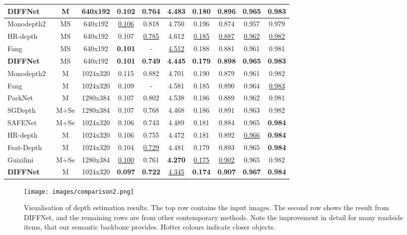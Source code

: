 \documentclass{bmvc2k}
\begin{document}
\begin{table*}[t]
{\begin{tabular}{|l |c|c||c c c c| c c c|}
\bf{DIFFNet} & M & 640x192 & \bf{0.102}  &   \bf{0.764}  &   \bf{4.483}  &   \bf{0.180}  &   \bf{0.896}  &   \bf{0.965}  &   \bf{0.983}  \\
\hline
\hline
Monodepth2~\cite{monodepth2}& MS & 640x192   & \underline{0.106} & 0.818 & 4.750 & 0.196 & 0.874 & 0.957 & 0.979\\
HR-depth~\cite{lyu2020hr}& MS & 640x192   & 0.107 & \underline{0.785} & 4.612 & \underline{0.185} & \underline{0.887} & \underline{0.962} & \underline{0.982}\\
Fang~\cite{fang2020towards}& MS & 640x192 & \bf{0.101} & - & \underline{4.512}  & 0.188 & 0.881 & 0.961 & 0.981 \\
\hline
\bf{DIFFNet} & MS & 640x192 &   \bf{0.101}  &   \bf{0.749}  &   \bf{4.445}  &   \bf{0.179}  &   \bf{0.898}  &   \bf{0.965}  &   \bf{0.983}\\
\hline
\hline
Monodepth2~\cite{monodepth2}& M & 1024x320 & 0.115 & 0.882 & 4.701 & 0.190 & 0.879 & 0.961 & 0.982\\
Fang~\cite{fang2020towards}& M & 1024x320 & 0.109 & - & 4.581  & 0.185 & 0.890 & 0.964 & \underline{0.983} \\
PackNet~\cite{guizilini2020}& M & 1280x384 & 0.107 & 0.802 & 4.538 & 0.186 & 0.889 & 0.962 & 0.981\\
SGDepth~\cite{klingner2020self}& M+Se & 1280x384  & 0.107 & 0.768 & 4.468 & 0.186 & 0.891 & 0.963 & 0.982\\
SAFENet~\cite{choi2020safenet}& M+Se & 1024x320 & 0.106 & 0.743 & 4.489 & 0.181 & 0.884 & 0.965 & \bf{0.984} \\
HR-depth~\cite{lyu2020hr}& M & 1024x320 & 0.106 & 0.755 & 4.472 & 0.181 & 0.892 & \underline{0.966} & \bf{0.984}\\
Feat-Depth~\cite{shu2020feature}& M & 1024x320   & 0.104& \underline{0.729} & 4.481&0.179 & 0.893 & 0.965 & \bf{0.984}\\
Guizilini~\cite{guizilini2020semantically}& M+Se & 1280x384 & \underline{0.100} & 0.761 & \bf{4.270} & \underline{0.175} & \underline{0.902} & 0.965 & 0.982 \\
\hline
\bf{DIFFNet}& M & 1024x320 &   \bf{0.097}  &  \bf{ 0.722}  &   \underline{4.345}  & \bf{0.174}    &   \bf{0.907}  &   \bf{0.967}  &   \bf{0.984}  \\

\hline
\end{tabular}}
\end{table*}
\begin{figure*}[ht]
\centering
\texttt{[image: images/comparison2.png]}
\caption{Visualisation of depth estimation results. The top row contains the input images. 
    The second row shows the result from DIFFNet, and the remaining rows are from other contemporary methods.
    Note the improvement in detail for many roadside items, that our semantic backbone provides.
    Hotter colours indicate closer objects.}
\label{fig:comparison}
\end{figure*}
\end{document}
